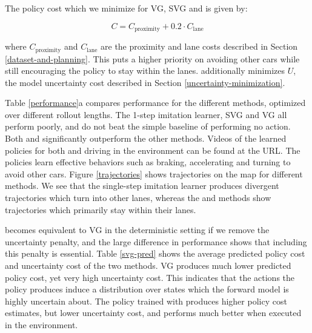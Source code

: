 \documentclass{article} %
\begin{document}
    The policy cost which we minimize for VG, SVG and \modelnamedrop is given by:

    \begin{equation}
      C = C_{\text{proximity}} + 0.2 \cdot C_\text{lane}
    \end{equation}

    where $C_{\text{proximity}}$ and $C_\text{lane}$ are the proximity and lane costs described in Section \ref{dataset-and-planning}. This puts a higher priority on avoiding other cars while still encouraging the policy to stay within the lanes. \modelnamedrop additionally minimizes $U$, the model uncertainty cost described in Section \ref{uncertainty-minimization}.


Table \ref{performance}a compares performance for the different methods, optimized over different rollout lengths.
The 1-step imitation learner, SVG and VG all perform poorly, and do not beat the simple baseline of performing no action.
Both \modelnamedrop and \modelnameil significantly outperform the other methods. 
Videos of the learned policies for both \modelnameil and \modelnamedrop driving in the environment can be found at the URL.
The policies learn effective behaviors such as braking, accelerating and turning to avoid other cars.
Figure \ref{trajectories} shows trajectories on the map for different methods. We see that the single-step imitation learner produces divergent trajectories which turn into other lanes, whereas the \modelnamedrop and \modelnameil methods show trajectories which primarily stay within their lanes.

\modelnamedrop becomes equivalent to VG in the deterministic setting if we remove the uncertainty penalty, and the large difference in performance shows that including this penalty is essential.
Table \ref{svg-pred} shows the average predicted policy cost and uncertainty cost of the two methods.
VG produces much lower predicted policy cost, yet very high uncertainty cost. This indicates that the actions the policy produces induce a distribution over states which the forward model is highly uncertain about. The policy trained with \modelnamedrop produces higher policy cost estimates, but lower uncertainty cost, and performs much better when executed in the environment.
\end{document}
